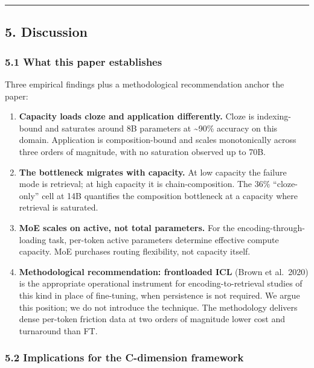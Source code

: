 \documentclass[
]{article}
\begin{document}
\begin{center}\rule{0.5\linewidth}{0.5pt}\end{center}

\subsection{5. Discussion}\label{discussion}

\subsubsection{5.1 What this paper
establishes}\label{what-this-paper-establishes}

Three empirical findings plus a methodological recommendation anchor the
paper:

\begin{enumerate}
\def\labelenumi{\arabic{enumi}.}
\item
  \textbf{Capacity loads cloze and application differently.} Cloze is
  indexing-bound and saturates around 8B parameters at
  \textasciitilde90\% accuracy on this domain. Application is
  composition-bound and scales monotonically across three orders of
  magnitude, with no saturation observed up to 70B.
\item
  \textbf{The bottleneck migrates with capacity.} At low capacity the
  failure mode is retrieval; at high capacity it is chain-composition.
  The 36\% ``cloze-only'' cell at 14B quantifies the composition
  bottleneck at a capacity where retrieval is saturated.
\item
  \textbf{MoE scales on active, not total parameters.} For the
  encoding-through-loading task, per-token active parameters determine
  effective compute capacity. MoE purchases routing flexibility, not
  capacity itself.
\item
  \textbf{Methodological recommendation: frontloaded ICL} (Brown et
  al.~2020) is the appropriate operational instrument for
  encoding-to-retrieval studies of this kind in place of fine-tuning,
  when persistence is not required. We argue this position; we do not
  introduce the technique. The methodology delivers dense per-token
  friction data at two orders of magnitude lower cost and turnaround
  than FT.
\end{enumerate}

\subsubsection{5.2 Implications for the C-dimension
framework}\label{implications-for-the-c-dimension-framework}
\end{document}
